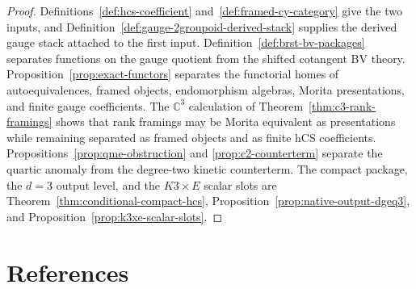 \documentclass[11pt]{amsart}
\theoremstyle{plain}
\theoremstyle{definition}
\theoremstyle{remark}
\providecommand{\C}{\mathbb{C}}
\begin{document}
\begin{proof}
Definitions~\ref{def:hcs-coefficient} and~\ref{def:framed-cy-category}
give the two inputs, and
Definition~\ref{def:gauge-2groupoid-derived-stack} supplies the
derived gauge stack attached to the first input.
Definition~\ref{def:brst-bv-packages} separates functions on the gauge
quotient from the shifted cotangent BV theory.
Proposition~\ref{prop:exact-functors} separates the functorial homes of
autoequivalences, framed objects, endomorphism algebras, Morita
presentations, and finite gauge coefficients. The \(\C^3\) calculation
of Theorem~\ref{thm:c3-rank-framings}
shows that rank framings may be Morita equivalent as presentations
while remaining separated as framed objects and as finite hCS
coefficients. Propositions~\ref{prop:qme-obstruction} and
\ref{prop:c2-counterterm} separate the quartic anomaly from the
degree-two kinetic counterterm. The compact package, the \(d=3\)
output level, and the \(K3\times E\) scalar slots are
Theorem~\ref{thm:conditional-compact-hcs},
Proposition~\ref{prop:native-output-dgeq3}, and
Proposition~\ref{prop:k3xe-scalar-slots}.
\end{proof}

\section{References}
\label{sec:references}
\end{document}

